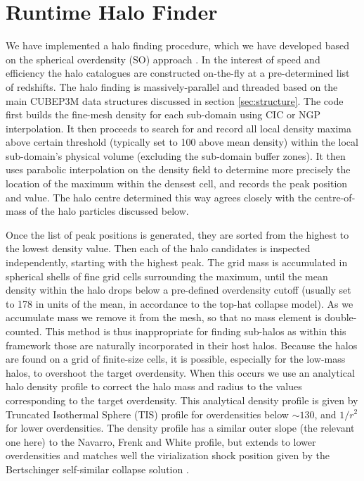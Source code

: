 \section{Runtime Halo Finder}
\label{sec:halo}


We have implemented a halo finding procedure, which we have developed 
based on the spherical overdensity (SO) approach \citep{1994MNRAS.271..676L}.
In the interest of speed and efficiency the halo catalogues are constructed 
on-the-fly at a pre-determined list of redshifts. The halo finding is 
massively-parallel and threaded based on the main {\small CUBEP3M} data structures 
discussed in section \ref{sec:structure}. The code first builds the 
fine-mesh density for each sub-domain using CIC or NGP interpolation. It then 
proceeds to search for and record all local density maxima above certain
threshold (typically set to 100 above mean density) within the local 
sub-domain's physical volume (excluding the sub-domain buffer zones). It then 
uses parabolic interpolation on the density field to determine more precisely
the location of the maximum within the densest cell, and records the peak 
position and value. The halo centre determined this way agrees closely with 
the centre-of-mass of the halo particles discussed below.  

Once the list of peak positions is generated, they are sorted from the highest 
to the lowest density value. Then each of the halo candidates is inspected 
independently, starting with the highest peak. The grid mass is accumulated 
in spherical shells of fine grid cells surrounding the maximum, until the 
mean density within the halo drops below a pre-defined overdensity cutoff 
(usually set to 178 in units of the mean, in accordance to the top-hat 
collapse model). As we accumulate mass we remove it from the mesh, so that no 
mass element is double-counted. This method is thus inappropriate for finding 
sub-halos as within this framework those are naturally incorporated in their 
host halos. Because the halos are found on a grid of finite-size cells, it is 
possible, especially for the low-mass halos, to overshoot the target overdensity.
When this occurs we use an analytical halo density profile to correct the 
halo mass and radius to the values corresponding to the target overdensity. 
This analytical density profile is given by Truncated Isothermal Sphere (TIS) 
profile \citep{1999MNRAS.307..203S,2001MNRAS.325..468I} for overdensities below 
$\sim130$, and $1/r^2$ for lower overdensities. The density profile has a
similar outer slope (the relevant one here) to the Navarro, Frenk and White 
\citep[NFW][]{1997ApJ...490..493N} profile, but extends to lower overdensities
and matches well the virialization shock position given by the Bertschinger 
self-similar collapse solution \citep{1985ApJS...58...39B}.

